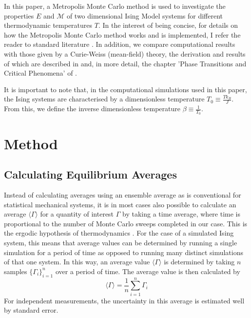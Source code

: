 \documentclass[11pt]{iopart}
\begin{document}
In this paper, a Metropolis Monte Carlo method is used to investigate the properties $E$ and $\mathcal{M}$ of two dimensional Ising Model systems for different thermodynamic temperatures $T$. In the interest of being concise, for details on how the Metropolis Monte Carlo method works and is implemented, I refer the reader to standard literature \cite{montecarlo}. In addition, we compare computational results with those given by a Curie-Weiss (mean-field) theory, the derivation and results of which are described in \cite{handout} and, in more detail, the chapter 'Phase Transitions and Critical Phenomena' of \cite{meanfield}.

It is important to note that, in the computational simulations used in this paper, the Ising systems are characterised by a dimensionless temperature $T_0 \equiv \frac{T k_B}{J}$. From this, we define the inverse dimensionless temperature $\beta \equiv \frac{1}{T_0}$.

\section{Method}

\subsection{Calculating Equilibrium Averages}

Instead of calculating averages using an ensemble average as is conventional for statistical mechanical systems, it is in most cases also possible to calculate an average $\langle \Gamma \rangle$ for a quantity of interest $\Gamma$ by taking a time average, where time is proportional to the number of Monte Carlo sweeps completed in our case. This is the ergodic hypothesis of thermodynamics \cite{statmech}.  For the case of a simulated Ising system, this means that average values can be determined by running a single simulation for a period of time as opposed to running many distinct simulations of that one system. In this way, an average value $\langle \Gamma \rangle$ is determined by taking $n$ samples $\{ \Gamma_i \}_{i=1}^{n}$ over a period of time. The average value is then calculated by  \cite{handout}
\begin{equation}
\label{eq:averages}
\langle \Gamma \rangle = \frac{1}{n}\sum_{i=1}^{n} \Gamma_i
\end{equation}
For independent measurements, the uncertainty in this average is estimated well by standard error.
\end{document}
